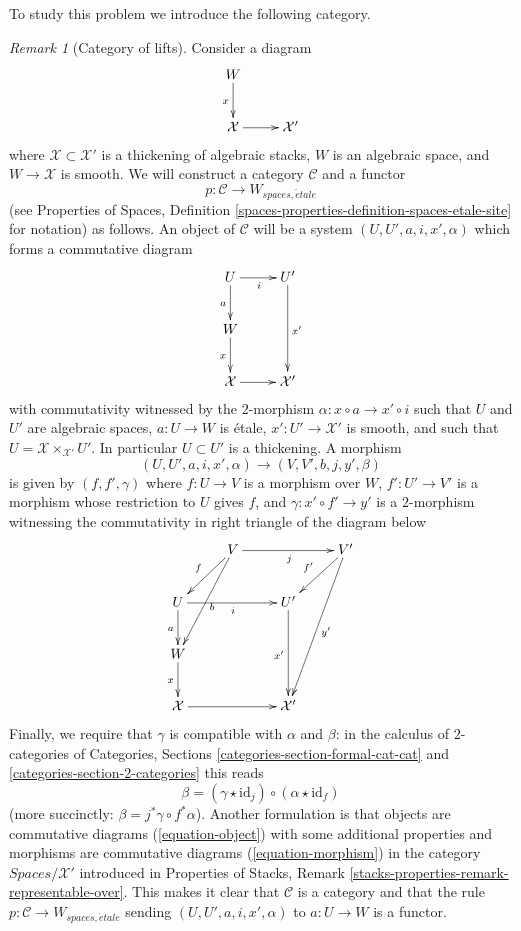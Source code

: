 \documentclass{stacks-project}
\theoremstyle{plain}
\theoremstyle{definition}
\theoremstyle{remark}
\newtheorem{remark}[subsection]{Remark}
\numberwithin{equation}{subsection}
\def\etale{{\acute{e}tale}}
\begin{document}
\medskip\noindent
To study this problem we introduce the following category.

\begin{remark}[Category of lifts]
\label{remark-gerbe-of-lifts}
Consider a diagram
$$
\xymatrix{
W \ar[d]_x \\
\mathcal{X} \ar[r] & \mathcal{X}'
}
$$
where $\mathcal{X} \subset \mathcal{X}'$ is a thickening of algebraic stacks,
$W$ is an algebraic space, and $W \to \mathcal{X}$ is smooth.
We will construct a category $\mathcal{C}$ and a functor
$$
p : \mathcal{C} \longrightarrow W_{spaces, \etale}
$$
(see Properties of Spaces, Definition
\ref{spaces-properties-definition-spaces-etale-site} for notation)
as follows. An object of $\mathcal{C}$ will be a system
$(U, U', a, i, x', \alpha)$
which forms a commutative diagram
\begin{equation}
\label{equation-object}
\vcenter{
\xymatrix{
U \ar[d]_a \ar[r]_i & U' \ar[dd]^{x'} \\
W \ar[d]_x & \\
\mathcal{X} \ar[r] & \mathcal{X}'
}
}
\end{equation}
with commutativity witnessed by the $2$-morphism
$\alpha : x \circ a \to x' \circ i$ such that
$U$ and $U'$ are algebraic spaces,
$a : U \to W$ is \'etale, $x' : U' \to \mathcal{X}'$ is smooth,
and such that $U = \mathcal{X} \times_{\mathcal{X}'} U'$.
In particular $U \subset U'$ is a thickening.
A morphism
$$
(U, U', a, i, x', \alpha) \to (V, V', b, j, y', \beta)
$$
is given by $(f, f', \gamma)$ where $f : U \to V$ is a morphism
over $W$, $f' : U' \to V'$ is a morphism whose restriction
to $U$ gives $f$, and $\gamma : x' \circ f' \to y'$ is a $2$-morphism
witnessing the commutativity in right triangle of the diagram below
\begin{equation}
\label{equation-morphism}
\vcenter{
\xymatrix{
& V \ar[ld]_f \ar[ldd]^b \ar[rr]_j & & V' \ar[ld]_{f'} \ar[lddd]^{y'} \\
U \ar[d]_a \ar[rr]_i & & U' \ar[dd]_{x'} \\
W \ar[d]_x & \\
\mathcal{X} \ar[rr] & & \mathcal{X}'
}
}
\end{equation}
Finally, we require that $\gamma$ is compatible with $\alpha$ and $\beta$:
in the calculus of $2$-categories of Categories, Sections
\ref{categories-section-formal-cat-cat} and
\ref{categories-section-2-categories} this reads
$$
\beta = (\gamma \star \text{id}_j) \circ (\alpha \star \text{id}_f)
$$
(more succinctly: $\beta = j^*\gamma \circ f^*\alpha$).
Another formulation is that objects are commutative diagrams
(\ref{equation-object}) with some additional properties and
morphisms are commutative diagrams
(\ref{equation-morphism}) in the category $\textit{Spaces}/\mathcal{X}'$
introduced in Properties of Stacks, Remark
\ref{stacks-properties-remark-representable-over}.
This makes it clear that $\mathcal{C}$ is a category
and that the rule $p : \mathcal{C} \to W_{spaces, \etale}$
sending $(U, U', a, i, x', \alpha)$ to $a : U \to W$
is a functor.
\end{remark}
\end{document}
